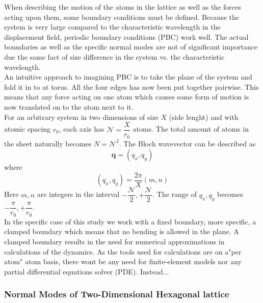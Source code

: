 When describing the motion of the atoms in the lattice as well as the forces acting upon them, some boundary conditions must be defined. Because the system is very large compared to the characteristic wavelength in the displacement field, periodic boundary conditions (PBC) work well. The actual boundaries as well as the specific normal modes are not of significant importance due the same fact of size difference in the system vs. the characteristic wavelength. \\
An intuitive approach to imagining PBC is to take the plane of the system and fold it in to at torus. All the four edges has now been put together pairwise. This means that any force acting on one atom which causes some form of motion is now translated on to the atom next to it.\\
For an arbitrary system in two dimensions of size $X$ (side lenght) and with atomic spacing $r_{0}$, each axis has $\mathcal{N}=\dfrac{X}{r_{0}}$ atoms. The total amount of atoms in the sheet naturally becomes $N=\mathcal{N}^{2}$. The Bloch wavevector can be described as
\begin{equation}
     \mathbf{q}=(q_{x},q_{y})
\end{equation}
where
\begin{equation}
     (q_{x},q_{y})=\dfrac{2\pi}{X}(m,n)
\end{equation}
Here $m,n$ are integers in the interval $-\dfrac{\mathcal{N}}{2}, +\dfrac{\mathcal{N}}{2}$. The range of $q_{x},q_{y}$ becomes $-\dfrac{\pi}{r_{0}},+\dfrac{\pi}{r_{0}}$.\\
In the specific case of this study we work with a fixed boundary, more specific, a clamped boundary which means that no bending is allowed in the plane. A clamped boundary results in the need for numerical approximations in calculations of the dynamics. As the tools used for calculations are on a"per atom" atom basis, there wont be any need for finite-element models nor any partial differential equations solver (PDE). Instead...

\subsubsection{Normal Modes of Two-Dimensional Hexagonal lattice}
 
